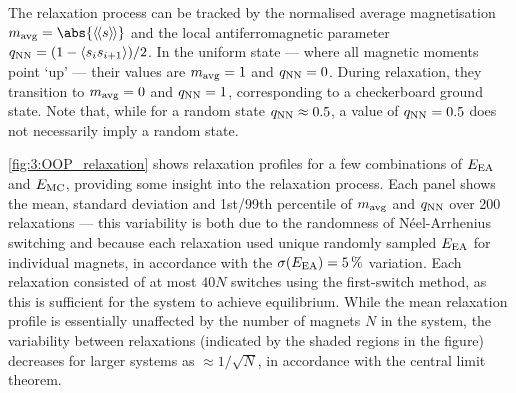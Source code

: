 The relaxation process can be tracked by the normalised average magnetisation $\mavg = \abs{\llangle s \rrangle}$ and the local antiferromagnetic parameter $q_\mathrm{NN} = (1 - \langle s_i s_{i+1} \rangle)/2$.
In the uniform state --- where all magnetic moments point `up' --- their values are $m_\mathrm{avg}=1$ and $q_\mathrm{NN}=0$.
During relaxation, they transition to $m_\mathrm{avg}=0$ and $q_\mathrm{NN}=1$, corresponding to a checkerboard ground state.
Note that, while for a random state $q_\mathrm{NN} \approx 0.5$, a value of $q_\mathrm{NN}=0.5$ does not necessarily imply a random state. \par

\cref{fig:3:OOP_relaxation} shows relaxation profiles for a few combinations of $E_\mathrm{EA}$ and $E_\mathrm{MC}$, providing some insight into the relaxation process.
Each panel shows the mean, standard deviation and 1st/99th percentile of $m_\mathrm{avg}$ and $q_\mathrm{NN}$ over 200 relaxations --- this variability is both due to the randomness of N\'eel-Arrhenius switching and because each relaxation used unique randomly sampled $E_\mathrm{EA}$ for individual magnets, in accordance with the $\sigma(E_\mathrm{EA}) = \SI{5}{\percent}$ variation.
Each relaxation consisted of at most $40N$ switches using the first-switch method, as this is sufficient for the system to achieve equilibrium.
While the mean relaxation profile is essentially unaffected by the number of magnets $N$ in the system, the variability between relaxations (indicated by the shaded regions in the figure) decreases for larger systems as $\approx 1/\sqrt{N}$, in accordance with the central limit theorem.


